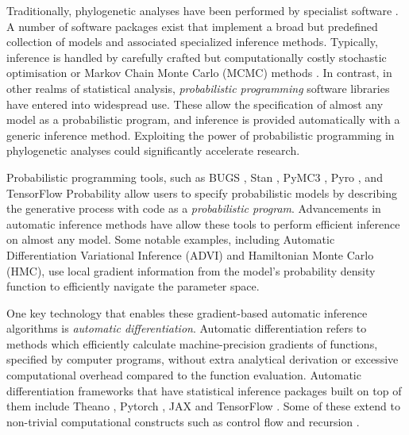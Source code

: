Traditionally, phylogenetic analyses have been performed by specialist software \cite{stamatakis2014raxml, drummond2012bayesian, huelsenbeck2001mrbayes}. A number of software packages exist that implement a broad but predefined collection of models and associated specialized inference methods. Typically, inference is handled by carefully crafted but computationally costly stochastic optimisation or Markov Chain Monte Carlo (MCMC) methods \cite{metropolis1953equation, hastings1970monte}. In contrast, in other realms of statistical analysis, \textit{probabilistic programming} software libraries have entered into widespread use. These allow the specification of almost any model as a probabilistic program, and inference is provided automatically with a generic inference method. Exploiting the power of probabilistic programming in phylogenetic analyses could significantly accelerate research.

Probabilistic programming tools, such as BUGS \cite{lunn2000winbugs}, Stan \cite{carpenter2017stan}, PyMC3 \cite{salvatier2016probabilistic}, Pyro \cite{bingham2019pyro}, and TensorFlow Probability \cite{dillon2017tensorflow} allow users to specify probabilistic models by describing the generative process with code as a \textit{probabilistic program}. Advancements in automatic inference methods have allow these tools to perform efficient inference on almost any model. Some notable examples, including Automatic Differentiation Variational Inference \cite{kucukelbir2017automatic} (ADVI) and Hamiltonian Monte Carlo \cite{duane1987hybrid} (HMC), use local  gradient information from the model's probability density function to efficiently navigate the parameter space.

One key technology that enables these gradient-based automatic inference algorithms is \textit{automatic differentiation}. Automatic differentiation refers to methods which efficiently calculate machine-precision gradients of functions, specified by computer programs, without extra analytical derivation or excessive computational overhead compared to the function evaluation. Automatic differentiation frameworks that have statistical inference packages built on top of them include Theano \cite{bergstra2010theano}, Pytorch \cite{paszke2019pytorch}, JAX \cite{jax2018github} and TensorFlow \cite{abadi2016tensorflow}. Some of these extend to non-trivial computational constructs such as control flow and recursion \cite{yu2018dynamic}.

